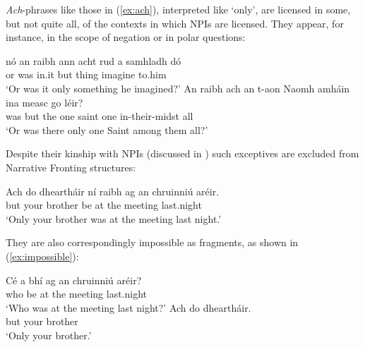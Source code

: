 \documentclass[output=paper,colorlinks,citecolor=brown]{langscibook}
\begin{document}
\noindent \textit{Ach}-phrases like those in (\ref{ex:ach}), interpreted like `only', are licensed in some, but not quite all, of the contexts in which NPIs are licensed. They appear, for instance, in the scope of negation or in polar questions:

\ea
\ea
\gll nó an raibh ann acht rud a samhladh dó \\
     or {\interr} was in.it but thing {\go} {imagine\pastaut} to.him \\
\glt `Or was it only something he imagined?'
\ex
\gll An raibh ach an t-aon Naomh amháin {ina measc} go léir? \\
     {\interr} was but the one saint one {in-their-midst} all \\
\glt `Or was there only one Saint among them all?'
\z
\z


\noindent Despite their kinship with NPIs (discussed in \cite{mccloskey:13}) such exceptives are excluded from Narrative Fronting structures: 

\ea
\gll *Ach do dheartháir ní raibh ag an chruinniú aréir. \\
     but your brother {\no} {be\past} at the meeting {last.night} \\
\glt `Only your brother was at the meeting last night.'
\z


\noindent They are also correspondingly impossible as fragments, as shown in (\ref{ex:impossible}):

\ea\label{ex:impossible}
\ea
\gll Cé a bhí ag an chruinniú aréir? \\         
     who {\C} {be\past} at the meeting {last.night} \\
\glt `Who was at the meeting last night?'
\ex
\gll *Ach do dheartháir. \\
     but your brother \\
\glt `Only your brother.'
\z
\z
\end{document}

